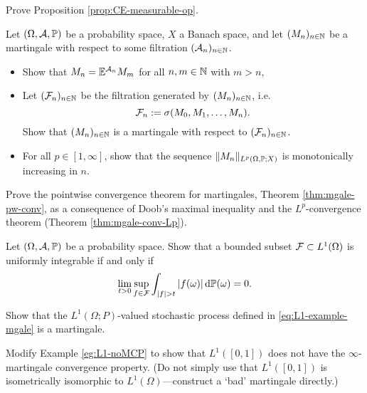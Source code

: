 \begin{exercise}\label{ex:CE-measurable-op}
  Prove Proposition \ref{prop:CE-measurable-op}.
\end{exercise}

\begin{exercise}\label{ex:martingale-elementary-properties}
  Let $(\Omega,\mc{A},\P)$ be a probability space, $X$ a Banach space, and let $(M_n)_{n \in \N}$ be a martingale with respect to some filtration $(\mc{A}_n)_{n \in \N}$.
  \begin{itemize}
  \item
    Show that $M_n = \E^{\mc{A}_n} M_m$ for all $n,m \in \N$ with $m > n$,
  \item
    Let $(\mc{F}_n)_{n \in \N}$ be the filtration generated by $(M_n)_{n \in \N}$, i.e.
    \begin{equation*}
      \mc{F}_n := \sigma(M_0, M_1, \ldots, M_n).
    \end{equation*}
    Show that $(M_n)_{n \in \N}$ is a martingale with respect to $(\mc{F}_n)_{n \in \N}$.
  \item
    For all $p \in [1,\infty]$, show that the sequence $\|M_n\|_{L^p(\Omega,\P;X)}$ is monotonically increasing in $n$.
  \end{itemize}
\end{exercise}

\begin{exercise}\label{ex:mgale-conv}
  Prove the pointwise convergence theorem for martingales, Theorem \ref{thm:mgale-pw-conv}, as a consequence of Doob's maximal inequality and the $L^p$-convergence theorem (Theorem \ref{thm:mgale-conv-Lp}).
\end{exercise}

\begin{exercise}\label{ex:UI-characterisation}
  Let $(\Omega,\mc{A},\P)$ be a probability space.
  Show that a bounded subset $\mc{F} \subset L^1(\Omega)$ is uniformly integrable if and only if
  \begin{equation*}
    \lim_{t > 0} \sup_{f \in \mc{F}} \int_{|f| > t} |f(\omega)| \, \dd\P(\omega) = 0.
  \end{equation*}
\end{exercise}


\begin{exercise}\label{ex:mgale-check}
  Show that the $L^1(\Omega;P)$-valued stochastic process defined in \eqref{eq:L1-example-mgale} is a martingale. %
\end{exercise}

\begin{exercise}\label{ex:L1-noMCP-var}
  Modify Example \ref{eg:L1-noMCP} to show that $L^1([0,1])$ does not have the $\infty$-martingale convergence property. (Do not simply use that $L^1([0,1])$ is isometrically isomorphic to $L^1(\Omega)$---construct a `bad' martingale directly.)
\end{exercise}




